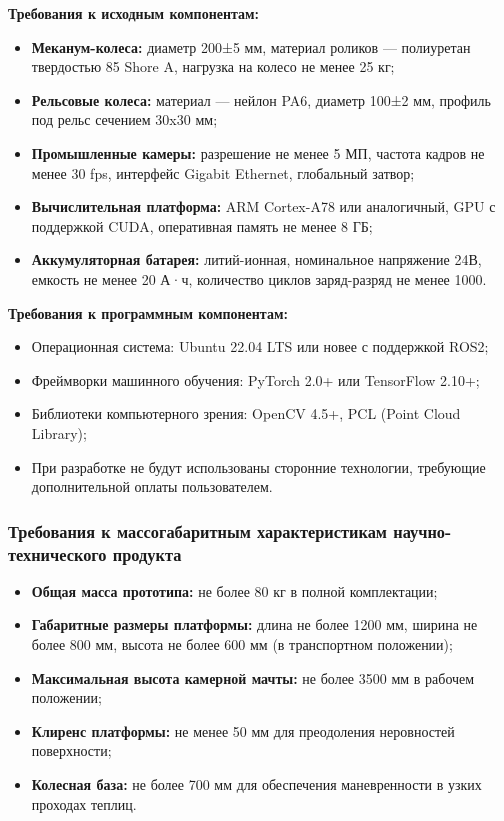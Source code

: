 \documentclass[12pt,a4paper]{article}
\begin{document}
\textbf{Требования к исходным компонентам:}
\begin{itemize}
\item \textbf{Меканум-колеса:} диаметр 200±5 мм, материал роликов — полиуретан твердостью 85 Shore A, нагрузка на колесо не менее 25 кг;
\item \textbf{Рельсовые колеса:} материал — нейлон PA6, диаметр 100±2 мм, профиль под рельс сечением 30x30 мм;
\item \textbf{Промышленные камеры:} разрешение не менее 5 МП, частота кадров не менее 30 fps, интерфейс Gigabit Ethernet, глобальный затвор;
\item \textbf{Вычислительная платформа:} ARM Cortex-A78 или аналогичный, GPU с поддержкой CUDA, оперативная память не менее 8 ГБ;
\item \textbf{Аккумуляторная батарея:} литий-ионная, номинальное напряжение 24В, емкость не менее 20 А·ч, количество циклов заряд-разряд не менее 1000.
\end{itemize}

\textbf{Требования к программным компонентам:}
\begin{itemize}
\item Операционная система: Ubuntu 22.04 LTS или новее с поддержкой ROS2;
\item Фреймворки машинного обучения: PyTorch 2.0+ или TensorFlow 2.10+;
\item Библиотеки компьютерного зрения: OpenCV 4.5+, PCL (Point Cloud Library);
\item При разработке не будут использованы сторонние технологии, требующие дополнительной оплаты пользователем.
\end{itemize}

\subsubsection{Требования к массогабаритным характеристикам научно-технического продукта}

\begin{itemize}
\item \textbf{Общая масса прототипа:} не более 80 кг в полной комплектации;
\item \textbf{Габаритные размеры платформы:} длина не более 1200 мм, ширина не более 800 мм, высота не более 600 мм (в транспортном положении);
\item \textbf{Максимальная высота камерной мачты:} не более 3500 мм в рабочем положении;
\item \textbf{Клиренс платформы:} не менее 50 мм для преодоления неровностей поверхности;
\item \textbf{Колесная база:} не более 700 мм для обеспечения маневренности в узких проходах теплиц.
\end{itemize}
\end{document}
